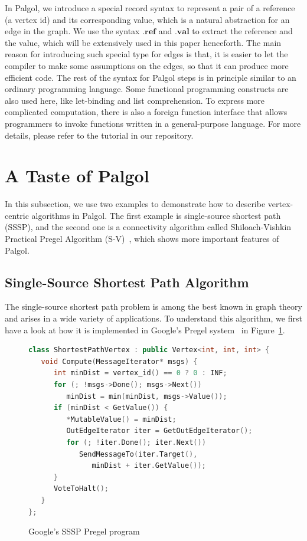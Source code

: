 \documentclass{sokendai_thesis} %
\begin{document}
In Palgol, we introduce a special record syntax to represent a pair of a reference (a vertex id) and its corresponding value, which is a natural abstraction for an edge in the graph.
We use the syntax $.\mathbf{ref}$ and $.\mathbf{val}$ to extract the reference and the value, which will be extensively used in this paper henceforth.
The main reason for introducing such special type for edges is that, it is easier to let the compiler to make some assumptions on the edges, so that it can produce more efficient code.
The rest of the syntax for Palgol steps is in principle similar to an ordinary programming language.
Some functional programming constructs are also used here, like let-binding and list comprehension.
To express more complicated computation, there is also a foreign function interface that allows programmers to invoke functions written in a general-purpose language.
For more details, please refer to the tutorial in our repository.

\section{A Taste of Palgol}
\label{sec:taste}

In this subsection, we use two examples to demonstrate how to describe vertex-centric algorithms in Palgol.
The first example is single-source shortest path (SSSP), and the second one is a connectivity algorithm called Shiloach-Vishkin Practical Pregel Algorithm (S-V)~\cite{connectivity}, which shows more important features of Palgol.

\subsection{Single-Source Shortest Path Algorithm}
\label{sec:sssp}

The single-source shortest path problem is among the best known in graph theory and arises in a wide variety of applications.
To understand this algorithm, we first have a look at how it is implemented in Google's Pregel system~\cite{pregel} in Figure~\ref{fig:sssp-pregel}.
\begin{figure}[thp]
\vspace{-2ex}
\begin{lstlisting}[basicstyle=\small\ttfamily,numbers=none,language=c++]
class ShortestPathVertex : public Vertex<int, int, int> {
   void Compute(MessageIterator* msgs) {
      int minDist = vertex_id() == 0 ? 0 : INF;
      for (; !msgs->Done(); msgs->Next())
         minDist = min(minDist, msgs->Value());
      if (minDist < GetValue()) {
         *MutableValue() = minDist;
         OutEdgeIterator iter = GetOutEdgeIterator();
         for (; !iter.Done(); iter.Next())
            SendMessageTo(iter.Target(),
               minDist + iter.GetValue());
      }
      VoteToHalt();
   }
};
\end{lstlisting}
\vspace{-2ex}
\caption{Google's SSSP Pregel program~\protect\cite{pregel}}
\label{fig:sssp-pregel}
\end{figure}
\end{document}
